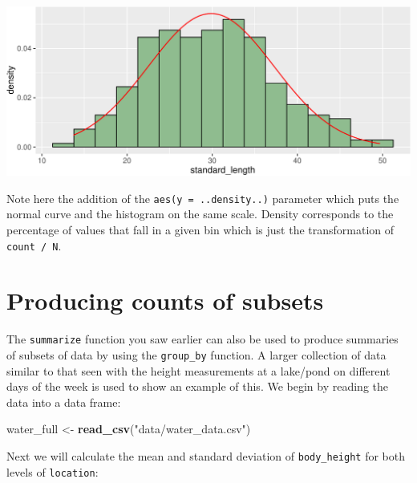 \documentclass[twoside, 12pt]{article}
\newenvironment{Shaded}{\begin{snugshade}}{\end{snugshade}}
\newcommand{\KeywordTok}[1]{\textcolor[rgb]{0.13,0.29,0.53}{\textbf{{#1}}}}
\newcommand{\DataTypeTok}[1]{\textcolor[rgb]{0.13,0.29,0.53}{{#1}}}
\newcommand{\StringTok}[1]{\textcolor[rgb]{0.31,0.60,0.02}{{#1}}}
\newcommand{\NormalTok}[1]{{#1}}
\newcommand{\nonumsection}[1]{
  \addtocontents{toc}{\protect\setcounter{tocdepth}{-1}}
  \section{#1}
  \addtocontents{toc}{\protect\setcounter{tocdepth}{1}}
}
\begin{document}
\includegraphics{skeleton_files/figure-latex/unnamed-chunk-23-1.pdf}

Note here the addition of the \texttt{aes(y\ =\ ..density..)} parameter
which puts the normal curve and the histogram on the same scale. Density
corresponds to the percentage of values that fall in a given bin which
is just the transformation of \texttt{count\ /\ N}.

\nonumsection{Producing counts of subsets}

The \texttt{summarize} function you saw earlier can also be used to
produce summaries of subsets of data by using the \texttt{group\_by}
function. A larger collection of data similar to that seen with the
height measurements at a lake/pond on different days of the week is used
to show an example of this. We begin by reading the data into a data
frame:

\begin{Shaded}
\begin{Highlighting}[]
\NormalTok{water_full <-}\StringTok{ }\KeywordTok{read_csv}\NormalTok{(}\StringTok{"data/water_data.csv"}\NormalTok{)}
\end{Highlighting}
\end{Shaded}

Next we will calculate the mean and standard deviation of
\texttt{body\_height} for both levels of \texttt{location}:

\begin{Shaded}
\end{Shaded}
\end{document}
